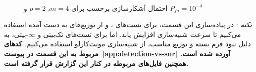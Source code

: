 \begin{figure}[!t]
	\centering
	 \\
	\caption[
	احتمال آشکارسازی برحسب 
	]{
		احتمال آشکارسازی برحسب  برای
		$m=4$، $p=2$ و
		$P_{fa}=10^{-4}$
	}
	\label{fig:detection_diff_n}
\end{figure}

\large \emph{نکته} :
\normalsize
در پیاده‌سازی این قسمت، برای تست‌های ،  و  از توزیع‌های به دست آمده استفاده می‌کنیم تا سرعت شبیه‌سازی افزایش یابد. اما برای تست‌های  تک‌بیتی و $\infty$-بیتی، به دلیل نبود فرم بسته و توزیع مناسب، از شبیه‌سازی مونت‌کارلو استفاده می‌کنیم.
\linebreak
\textbf{
	کدهای مربوط به این قسمت در  پیوست~\ref{app:detection-vs-snr} آورده شده است. همچنین فایل‌های مربوطه در کنار این گزارش قرار گرفته است.
}

